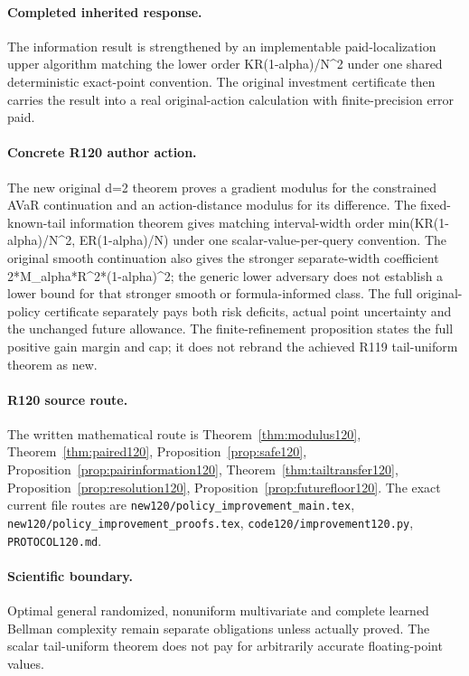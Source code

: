 \paragraph{Completed inherited response.}
The information result is strengthened by an implementable paid-localization upper algorithm matching the lower order KR(1-alpha)/N\textasciicircum{}2 under one shared deterministic exact-point convention. The original investment certificate then carries the result into a real original-action calculation with finite-precision error paid.
\paragraph{Concrete R120 author action.}
The new original d=2 theorem proves a gradient modulus for the constrained AVaR continuation and an action-distance modulus for its difference. The fixed-known-tail information theorem gives matching interval-width order min(KR(1-alpha)/N\textasciicircum{}2, ER(1-alpha)/N) under one scalar-value-per-query convention. The original smooth continuation also gives the stronger separate-width coefficient 2*M\_alpha*R\textasciicircum{}2*(1-alpha)\textasciicircum{}2; the generic lower adversary does not establish a lower bound for that stronger smooth or formula-informed class. The full original-policy certificate separately pays both risk deficits, actual point uncertainty and the unchanged future allowance. The finite-refinement proposition states the full positive gain margin and cap; it does not rebrand the achieved R119 tail-uniform theorem as new.
\paragraph{R120 source route.}
The written mathematical route is Theorem~\ref{thm:modulus120}, Theorem~\ref{thm:paired120}, Proposition~\ref{prop:safe120}, Proposition~\ref{prop:pairinformation120}, Theorem~\ref{thm:tailtransfer120}, Proposition~\ref{prop:resolution120}, Proposition~\ref{prop:futurefloor120}. The exact current file routes are \nolinkurl{new120/policy_improvement_main.tex}, \nolinkurl{new120/policy_improvement_proofs.tex}, \nolinkurl{code120/improvement120.py}, \nolinkurl{PROTOCOL120.md}.
\paragraph{Scientific boundary.}
Optimal general randomized, nonuniform multivariate and complete learned Bellman complexity remain separate obligations unless actually proved. The scalar tail-uniform theorem does not pay for arbitrarily accurate floating-point values.

